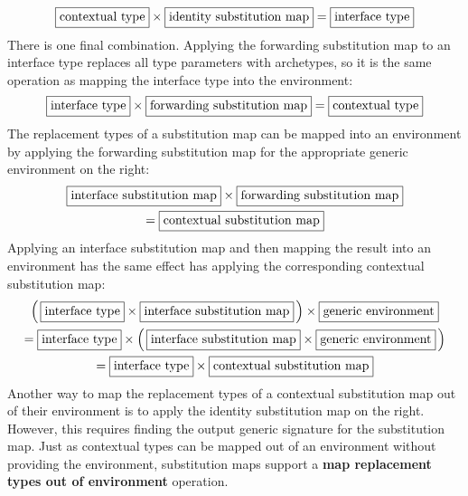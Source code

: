 \documentclass[a4paper,headsepline,bibliography=totoc,toc=flat,fleqn,twoside=semi]{scrbook}
\theoremstyle{definition}
\theoremstyle{definition}
\theoremstyle{definition}
\newcommand{\mathboxed}[1]{\boxed{\mbox{\vphantom{pI\texttt{pI}}#1}}}
\begin{document}
\[\mathboxed{contextual type}\times\mathboxed{identity substitution map} = \mathboxed{interface type}\]
There is one final combination. Applying the forwarding substitution map to an interface type replaces all type parameters with archetypes, so it is the same operation as mapping the interface type into the environment:
\[\mathboxed{interface type}\times\mathboxed{forwarding substitution map} = \mathboxed{contextual type}\]
The replacement types of a substitution map can be mapped into an environment by applying the forwarding substitution map for the appropriate generic environment on the right:
\begin{multline*}\mathboxed{interface substitution map}\times\mathboxed{forwarding substitution map} \\
= \mathboxed{contextual substitution map}
\end{multline*}
Applying an interface substitution map and then mapping the result into an environment has the same effect has applying the corresponding contextual substitution map:
\begin{multline*}
\left(\,\mathboxed{interface type}\times \mathboxed{interface substitution map}\,\right)\times\mathboxed{generic environment}\\
= \mathboxed{interface type}\times \left(\,\mathboxed{interface substitution map} \times\mathboxed{generic environment}\,\right)\\
= \mathboxed{interface type}\times \mathboxed{contextual substitution map}
\end{multline*}
Another way to map the replacement types of a contextual substitution map out of their environment is to apply the identity substitution map on the right. However, this requires finding the output generic signature for the substitution map. Just as contextual types can be mapped out of an environment without providing the environment, substitution maps support a \textbf{map replacement types out of environment} operation.
\end{document}
